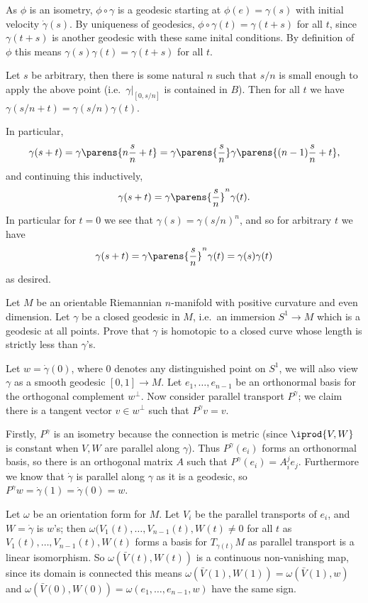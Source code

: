     \item As $\phi$ is an isometry, $\phi\circ\gamma$ is a geodesic starting at $\phi(e)=\gamma(s)$ with initial velocity $\dot\gamma(s)$.
    By uniqueness of geodesics, $\phi\circ\gamma(t)=\gamma(t+s)$ for all $t$, since $\gamma(t+s)$ is another geodesic with these same inital conditions.
    By definition of $\phi$ this means $\gamma(s)\gamma(t)=\gamma(t+s)$ for all $t$.

    \item Let $s$ be arbitrary, then there is some natural $n$ such that $s/n$ is small enough to apply the above point (i.e.\ $\gamma|_{[0,s/n]}$ is contained in $B$).
    Then for all $t$ we have $\gamma(s/n+t)=\gamma(s/n)\gamma(t)$.

    In particular,
    $$ \gamma(s + t) = \gamma\parens{n\frac sn+t} = \gamma\parens{\frac sn}\gamma\parens{(n-1)\frac sn + t} , $$
    and continuing this inductively,
    $$ \gamma(s + t) = \gamma\parens{\frac sn}^n\gamma(t) . $$
    In particular for $t=0$ we see that $\gamma(s)=\gamma(s/n)^n$, and so for arbitrary $t$ we have
    $$ \gamma(s+t) = \gamma\parens{\frac sn}^n\gamma(t) = \gamma(s)\gamma(t) $$
    as desired.
\eenum

\bprob

    Let $M$ be an orientable Riemannian $n$-manifold with positive curvature and even dimension.
    Let $\gamma$ be a closed geodesic in $M$, i.e.\ an immersion $S^1\to M$ which is a geodesic at all points.
    Prove that $\gamma$ is homotopic to a closed curve whose length is strictly less than $\gamma$'s.

\eprob

Let $w=\dot\gamma(0)$, where $0$ denotes any distinguished point on $S^1$, we will also view $\gamma$ as a smooth geodesic $[0,1]\to M$.
Let $e_1,\dots,e_{n-1}$ be an orthonormal basis for the orthogonal complement $w^\perp$.
Now consider parallel transport $P^\gamma$; we claim there is a tangent vector $v\in w^\perp$ such that $P^\gamma v=v$.

Firstly, $P^\gamma$ is an isometry because the connection is metric (since $\iprod{V,W}$ is constant when $V,W$ are parallel along $\gamma$).
Thus $P^\gamma(e_i)$ forms an orthonormal basis, so there is an orthogonal matrix $A$ such that $P^\gamma(e_i)=A^j_ie_j$.
Furthermore we know that $\dot\gamma$ is parallel along $\gamma$ as it is a geodesic, so $P^\gamma w=\dot\gamma(1)=\dot\gamma(0)=w$.

Let $\omega$ be an orientation form for $M$.
Let $V_i$ be the parallel transports of $e_i$, and $W=\dot\gamma$ is $w$'s; then $\omega(V_1(t),\dots,V_{n-1}(t),W(t)\neq0$ for all $t$ as $V_1(t),\dots,V_{n-1}(t),W(t)$
forms a basis for $T_{\gamma(t)}M$ as parallel transport is a linear isomorphism.
So $\omega(\bar V(t),W(t))$ is a continuous non-vanishing map, since its domain is connected this means $\omega(\bar V(1),W(1))=\omega(\bar V(1),w)$
and $\omega(\bar V(0),W(0))=\omega(e_1,\dots,e_{n-1},w)$ have the same sign.

